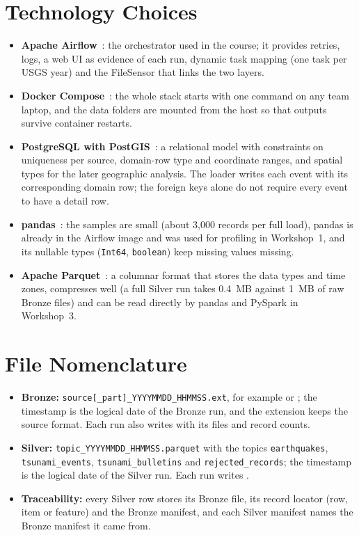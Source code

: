 \documentclass[a4paper,11pt,oneside]{book}
\begin{document}
\section{Technology Choices}
\begin{itemize}[nosep]
  \item \textbf{Apache Airflow}~\cite{airflow}: the orchestrator used in the course; it provides retries, logs, a web UI as evidence of each run, dynamic task mapping (one task per USGS year) and the FileSensor that links the two layers.
  \item \textbf{Docker Compose}~\cite{compose}: the whole stack starts with one command on any team laptop, and the data folders are mounted from the host so that outputs survive container restarts.
  \item \textbf{PostgreSQL with PostGIS}~\cite{postgis}: a relational model with constraints on uniqueness per source, domain-row type and coordinate ranges, and spatial types for the later geographic analysis. The loader writes each event with its corresponding domain row; the foreign keys alone do not require every event to have a detail row.
  \item \textbf{pandas}~\cite{pandas}: the samples are small (about 3,000 records per full load), pandas is already in the Airflow image and was used for profiling in Workshop~1, and its nullable types (\texttt{Int64}, \texttt{boolean}) keep missing values missing.
  \item \textbf{Apache Parquet}~\cite{parquet}: a columnar format that stores the data types and time zones, compresses well (a full Silver run takes 0.4~MB against 1~MB of raw Bronze files) and can be read directly by pandas and PySpark in Workshop~3.
\end{itemize}

\section{File Nomenclature}
\begin{itemize}[nosep]
  \item \textbf{Bronze:} \texttt{source[\_part]\_YYYYMMDD\_HHMMSS.ext}, for example  or ; the timestamp is the logical date of the Bronze run, and the extension keeps the source format. Each run also writes  with its files and record counts.
  \item \textbf{Silver:} \texttt{topic\_YYYYMMDD\_HHMMSS.parquet} with the topics \texttt{earthquakes}, \texttt{tsunami\_events}, \texttt{tsunami\_bulletins} and \texttt{rejected\_records}; the timestamp is the logical date of the Silver run. Each run writes .
  \item \textbf{Traceability:} every Silver row stores its Bronze file, its record locator (row, item or feature) and the Bronze manifest, and each Silver manifest names the Bronze manifest it came from.
\end{itemize}
\end{document}
